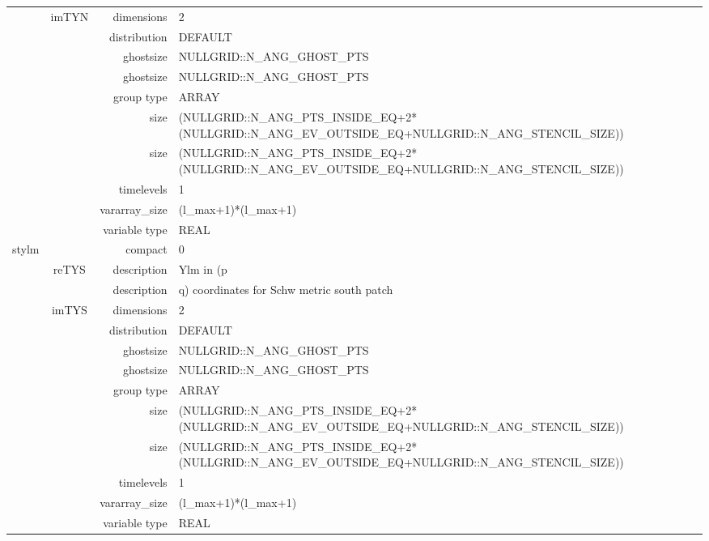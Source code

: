 \begin{tabular*}{150mm}{|c|c@{\extracolsep{\fill}}|rl|}
 & imTYN & dimensions & 2 \\ 
 &  & distribution & DEFAULT \\ 
 &  & ghostsize & NULLGRID::N\_ANG\_GHOST\_PTS \\ 
& ~ & ghostsize & NULLGRID::N\_ANG\_GHOST\_PTS \\ 
 &  & group type & ARRAY \\ 
 &  & size & (NULLGRID::N\_ANG\_PTS\_INSIDE\_EQ+2*(NULLGRID::N\_ANG\_EV\_OUTSIDE\_EQ+NULLGRID::N\_ANG\_STENCIL\_SIZE)) \\ 
& ~ & size & (NULLGRID::N\_ANG\_PTS\_INSIDE\_EQ+2*(NULLGRID::N\_ANG\_EV\_OUTSIDE\_EQ+NULLGRID::N\_ANG\_STENCIL\_SIZE)) \\ 
 &  & timelevels & 1 \\ 
 &  & vararray\_size & (l\_max+1)*(l\_max+1) \\ 
 &  & variable type & REAL \\ 
\hline 
stylm &  & compact & 0 \\ 
 & reTYS & description & Ylm in (p \\ 
& ~ & description & q) coordinates for Schw metric south patch \\ 
 & imTYS & dimensions & 2 \\ 
 &  & distribution & DEFAULT \\ 
 &  & ghostsize & NULLGRID::N\_ANG\_GHOST\_PTS \\ 
& ~ & ghostsize & NULLGRID::N\_ANG\_GHOST\_PTS \\ 
 &  & group type & ARRAY \\ 
 &  & size & (NULLGRID::N\_ANG\_PTS\_INSIDE\_EQ+2*(NULLGRID::N\_ANG\_EV\_OUTSIDE\_EQ+NULLGRID::N\_ANG\_STENCIL\_SIZE)) \\ 
& ~ & size & (NULLGRID::N\_ANG\_PTS\_INSIDE\_EQ+2*(NULLGRID::N\_ANG\_EV\_OUTSIDE\_EQ+NULLGRID::N\_ANG\_STENCIL\_SIZE)) \\ 
 &  & timelevels & 1 \\ 
 &  & vararray\_size & (l\_max+1)*(l\_max+1) \\ 
 &  & variable type & REAL \\ 
\hline 
\end{tabular*} 



\vspace{5mm}
\vspace{5mm}

